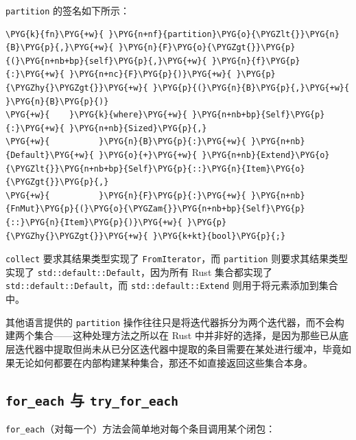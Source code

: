 \texttt{partition} 的签名如下所示：

\begin{Verbatim}[commandchars=\\\{\},breaklines=true,breakanywhere=true,fontsize=\codefont,xleftmargin=17bp]
\PYG{k}{fn}\PYG{+w}{ }\PYG{n+nf}{partition}\PYG{o}{\PYGZlt{}}\PYG{n}{B}\PYG{p}{,}\PYG{+w}{ }\PYG{n}{F}\PYG{o}{\PYGZgt{}}\PYG{p}{(}\PYG{n+nb+bp}{self}\PYG{p}{,}\PYG{+w}{ }\PYG{n}{f}\PYG{p}{:}\PYG{+w}{ }\PYG{n+nc}{F}\PYG{p}{)}\PYG{+w}{ }\PYG{p}{\PYGZhy{}\PYGZgt{}}\PYG{+w}{ }\PYG{p}{(}\PYG{n}{B}\PYG{p}{,}\PYG{+w}{ }\PYG{n}{B}\PYG{p}{)}
\PYG{+w}{    }\PYG{k}{where}\PYG{+w}{ }\PYG{n+nb+bp}{Self}\PYG{p}{:}\PYG{+w}{ }\PYG{n+nb}{Sized}\PYG{p}{,}
\PYG{+w}{          }\PYG{n}{B}\PYG{p}{:}\PYG{+w}{ }\PYG{n+nb}{Default}\PYG{+w}{ }\PYG{o}{+}\PYG{+w}{ }\PYG{n+nb}{Extend}\PYG{o}{\PYGZlt{}}\PYG{n+nb+bp}{Self}\PYG{p}{::}\PYG{n}{Item}\PYG{o}{\PYGZgt{}}\PYG{p}{,}
\PYG{+w}{          }\PYG{n}{F}\PYG{p}{:}\PYG{+w}{ }\PYG{n+nb}{FnMut}\PYG{p}{(}\PYG{o}{\PYGZam{}}\PYG{n+nb+bp}{Self}\PYG{p}{::}\PYG{n}{Item}\PYG{p}{)}\PYG{+w}{ }\PYG{p}{\PYGZhy{}\PYGZgt{}}\PYG{+w}{ }\PYG{k+kt}{bool}\PYG{p}{;}
\end{Verbatim}

\texttt{collect} 要求其结果类型实现了 \texttt{FromIterator}，而 \texttt{partition} 则要求其结果类型实现了 \texttt{std::default::Default}，因为所有 Rust 集合都实现了 \texttt{std::default::Default}，而 \texttt{std::default::Extend} 则用于将元素添加到集合中。

其他语言提供的 \texttt{partition} 操作往往只是将迭代器拆分为两个迭代器，而不会构建两个集合——这种处理方法之所以在 Rust 中并非好的选择，是因为那些已从底层迭代器中提取但尚未从已分区迭代器中提取的条目需要在某处进行缓冲，毕竟如果无论如何都要在内部构建某种集合，那还不如直接返回这些集合本身。

\subsection{\texttt{for\_each} 与 \texttt{try\_for\_each}}

\texttt{for\_each}（对每一个）方法会简单地对每个条目调用某个闭包：

